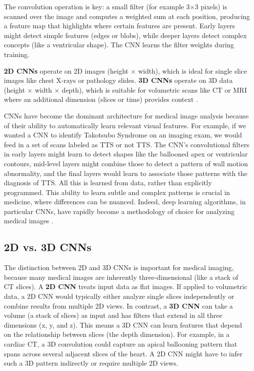 \documentclass[12pt, BSc]{muthesis}
\begin{document}
The convolution operation is key: a small filter (for example 3×3 pixels) is scanned over the image and computes a weighted sum at each position, producing a feature map that highlights where certain features are present. Early layers might detect simple features (edges or blobs), while deeper layers detect complex concepts (like a ventricular shape). The CNN learns the filter weights during training.

\textbf{2D CNNs} operate on 2D images (height × width), which is ideal for single slice images like chest X-rays or pathology slides. \textbf{3D CNNs} operate on 3D data (height × width × depth), which is suitable for volumetric scans like CT or MRI where an additional dimension (slices or time) provides context \cite{cciccek20163d}.

CNNs have become the dominant architecture for medical image analysis because of their ability to automatically learn relevant visual features. For example, if we wanted a CNN to identify Takotsubo Syndrome on an imaging exam, we would feed in a set of scans labeled as TTS or not TTS. The CNN's convolutional filters in early layers might learn to detect shapes like the ballooned apex or ventricular contours, mid-level layers might combine those to detect a pattern of wall motion abnormality, and the final layers would learn to associate those patterns with the diagnosis of TTS. All this is learned from data, rather than explicitly programmed. This ability to learn subtle and complex patterns is crucial in medicine, where differences can be nuanced. Indeed, deep learning algorithms, in particular CNNs, have rapidly become a methodology of choice for analyzing medical images \cite{litjens2017survey}.

\subsection{2D vs. 3D CNNs}

The distinction between 2D and 3D CNNs is important for medical imaging, because many medical images are inherently three-dimensional (like a stack of CT slices). A \textbf{2D CNN} treats input data as flat images. If applied to volumetric data, a 2D CNN would typically either analyze single slices independently or combine results from multiple 2D views. In contrast, a \textbf{3D CNN} can take a volume (a stack of slices) as input and has filters that extend in all three dimensions (x, y, and z). This means a 3D CNN can learn features that depend on the relationship between slices (the depth dimension). For example, in a cardiac CT, a 3D convolution could capture an apical ballooning pattern that spans across several adjacent slices of the heart. A 2D CNN might have to infer such a 3D pattern indirectly or require multiple 2D views.
\end{document}
